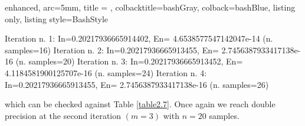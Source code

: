 \documentclass[a4paper, twosided]{book}
\begin{document}
\vspace{0.2cm}
\begin{tcblisting}{enhanced,
                   arc=5mm,
                   title = \color{black}{\large \ttfamily Executing the bessels test case: b\_3(x)},
                   colbacktitle=bashGray,
                   colback=bashBlue,
                   listing only,
                   listing style=BashStyle}

Iteration n. 1:  In=0.20217936665914402, En= 4.6538577547142047e-14   (n. samples=16)
Iteration n. 2:  In=0.20217936665913455, En= 2.7456387933417138e-16   (n. samples=20)
Iteration n. 3:  In=0.20217936665913452, En= 4.1184581900125707e-16   (n. samples=24)
Iteration n. 4:  In=0.20217936665913455, En= 2.7456387933417138e-16   (n. samples=26)

\end{tcblisting}
\vspace{0.3cm}

\noindent
which can be checked against Table \ref{table2.7}. Once again we reach double precision at the second iteration $(m=3)$ with $n=20$ samples. 
\end{document}
